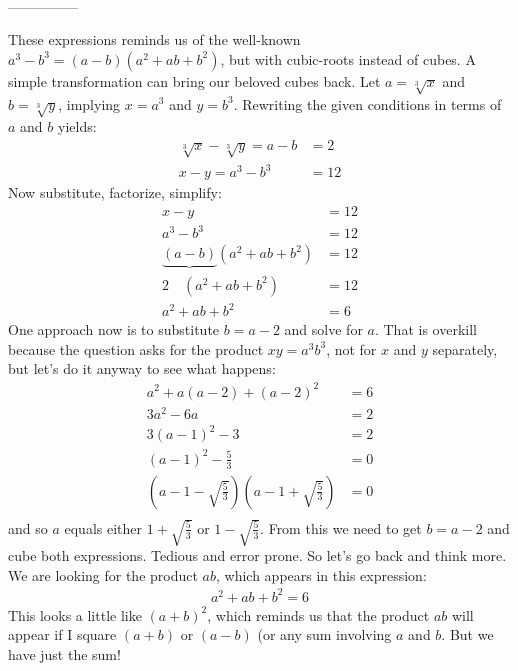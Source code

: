 \documentclass[12pt]{article}
\begin{document}
\begin{minipage}[b]{\linewidth}
\fbox{\phantom{ANSWER}}\\
\mbox{---------------}\\
\fbox{\phantom{ANSWER}}
\end{minipage}

\begin{answer}
These expressions reminds us of the well-known $a^3-b^3=(a-b)(a^2+ab+b^2)$, but with cubic-roots instead of cubes. A simple transformation can bring our beloved cubes back. Let $a=\sqrt[3]{x}$ and $b=\sqrt[3]{y}$, implying $x=a^3$ and $y=b^3$. Rewriting the given conditions in terms of $a$ and $b$ yields:
\begin{align*}
\sqrt[3]{x} - \sqrt[3]{y} = a - b & = 2 \\
x - y = a^3 - b^3 & = 12 
\end{align*}
Now substitute, factorize, simplify:
\begin{align*}
x - y 
  & = 12 \\
a^3 - b^3 
  & = 12 \\ 
\underbrace{(a-b)}(a^2 + ab + b^2) 
  & = 12 \\
2 \quad (a^2 + ab + b^2) 
  & = 12 \\
a^2 + ab + b^2
  & = 6
\end{align*}
One approach now is to substitute $b=a-2$ and solve for $a$. That is overkill because the question asks for the product $xy=a^3b^3$, not for $x$ and $y$ separately, but let's do it anyway to see what happens:
\begin{align*}
a^2 + a(a-2) + (a-2)^2 & = 6 \\
3a^2 - 6a & = 2 \\ 
3(a-1)^2 - 3 & = 2\\
(a-1)^2 - \frac{5}{3} & = 0\\
\left(a-1-\sqrt{\frac{5}{3}}\right) \left(a-1+\sqrt{\frac{5}{3}}\right) & = 0\\
\end{align*}
and so $a$ equals either $1+\sqrt{\frac{5}{3}}$ or $1-\sqrt{\frac{5}{3}}$. From this we need to get $b=a-2$ and cube both expressions. Tedious and error prone. So let's go back and think more. We are looking for the product $ab$, which appears in this expression:
\begin{align*}
a^2 + ab + b^2 = 6
\end{align*} 
This looks a little like $(a+b)^2$, which reminds us that the product $ab$ will appear if I square $(a+b)$ or $(a-b)$ (or any sum involving $a$ and $b$. But we have just the sum!

\end{answer}
\end{document}
